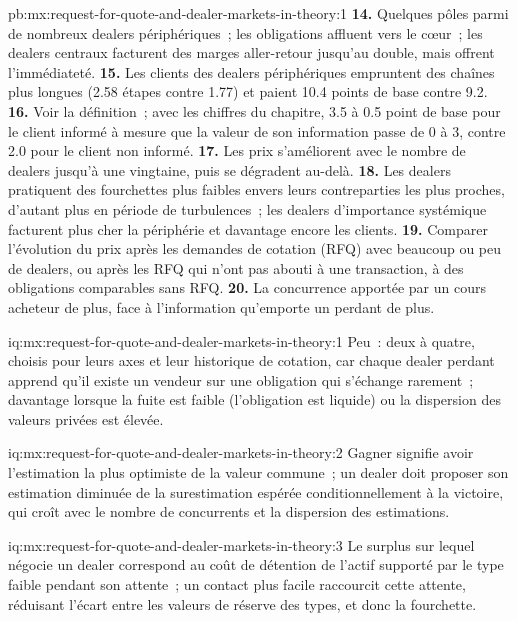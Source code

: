 \begin{solution}{pb:mx:request-for-quote-and-dealer-markets-in-theory:1}
\textbf{14.} Quelques pôles parmi de nombreux dealers périphériques~; les obligations affluent vers le cœur~; les dealers centraux facturent des marges aller-retour jusqu'au double, mais offrent
l'immédiateté.
\textbf{15.} Les clients des dealers périphériques empruntent des chaînes plus longues (2.58 étapes contre 1.77) et paient 10.4 points de base contre 9.2.
\textbf{16.} Voir la définition~; avec les chiffres du chapitre, 3.5 à 0.5 point de base pour le client informé à mesure que la valeur de son information passe de 0 à
3, contre 2.0 pour le client non informé.
\textbf{17.} Les prix s'améliorent avec le nombre de dealers jusqu'à une vingtaine, puis se dégradent au-delà.
\textbf{18.} Les dealers pratiquent des fourchettes plus faibles envers leurs contreparties les plus proches, d'autant plus en période de turbulences~; les dealers d'importance systémique facturent plus cher la périphérie et
davantage encore les clients.
\textbf{19.} Comparer l'évolution du prix après les demandes de cotation (RFQ) avec beaucoup ou peu de dealers, ou après les RFQ qui n'ont pas abouti à une transaction, à des obligations comparables sans RFQ.
\textbf{20.} La concurrence apportée par un cours acheteur de plus, face à l'information qu'emporte un perdant de plus.
\end{solution}

\begin{solution}{iq:mx:request-for-quote-and-dealer-markets-in-theory:1}
Peu~: deux à quatre, choisis pour leurs axes et leur historique de cotation, car chaque dealer perdant apprend qu'il existe un vendeur sur une obligation qui s'échange rarement~; davantage lorsque
la fuite est faible (l'obligation est liquide) ou la dispersion des valeurs privées est élevée.
\end{solution}

\begin{solution}{iq:mx:request-for-quote-and-dealer-markets-in-theory:2}
Gagner signifie avoir l'estimation la plus optimiste de la valeur commune~; un dealer doit proposer son estimation diminuée de la surestimation espérée conditionnellement
à la victoire, qui croît avec le nombre de concurrents et la dispersion des estimations.
\end{solution}

\begin{solution}{iq:mx:request-for-quote-and-dealer-markets-in-theory:3}
Le surplus sur lequel négocie un dealer correspond au coût de détention de l'actif supporté par le type faible pendant son attente~; un contact plus facile raccourcit cette attente, réduisant
l'écart entre les valeurs de réserve des types, et donc la fourchette.
\end{solution}

